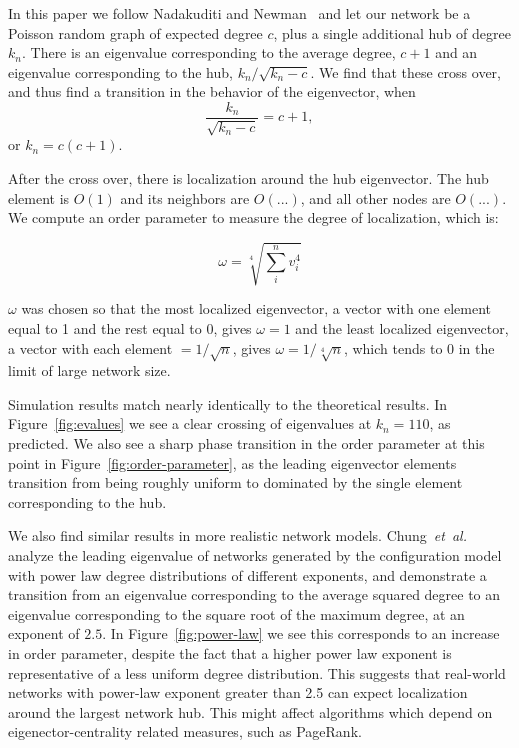 \documentclass[twocolumn,prl,superscriptaddress]{revtex4}
\newcommand{\etal}{{\it{}et~al.}}
\begin{document}
In this paper we follow Nadakuditi and Newman~\cite{nadakuditi13} and let our network be a Poisson random graph of expected degree $c$, plus a single additional hub of degree $k_n$. There is an eigenvalue corresponding to the average degree, $c+1$ and an eigenvalue corresponding to the hub, $k_n / \sqrt{k_n - c}$. We find that these cross over, and thus find a transition in the behavior of the eigenvector, when \begin{equation}\frac{k_n}{\sqrt{k_n - c}} = c+1,\end{equation} or $k_n = c(c+1)$.

After the cross over, there is localization around the hub eigenvector. The hub element is $O(1)$ and its neighbors are $O(...)$, and all other nodes are $O(...)$. We compute an order parameter to measure the degree of localization, which is:

\begin{equation}
  \omega = \sqrt[4]{\sum_i^n v_i ^ 4}
\end{equation}

$\omega$ was chosen so that the most localized eigenvector, a vector with one element equal to 1 and the rest equal to 0, gives $\omega = 1$ and the least localized eigenvector, a vector with each element $= 1/\sqrt{n}$, gives $\omega = 1/\sqrt[4]{n}$, which tends to 0 in the limit of large network size. 

Simulation results match nearly identically to the theoretical results. In Figure~\ref{fig:evalues} we see a clear crossing of eigenvalues at $k_n = 110$, as predicted. We also see a sharp phase transition in the order parameter at this point in Figure~\ref{fig:order-parameter}, as the leading eigenvector elements transition from being roughly uniform to dominated by the single element corresponding to the hub.

We also find similar results in more realistic network models. Chung~\etal~\cite{chung03} analyze the leading eigenvalue of networks generated by the configuration model with power law degree distributions of different exponents, and demonstrate a transition from an eigenvalue corresponding to the average squared degree to an eigenvalue corresponding to the square root of the maximum degree, at an exponent of $2.5$. In Figure~\ref{fig:power-law} we see this corresponds to an increase in order parameter, despite the fact that a higher power law exponent is representative of a less uniform degree distribution. This suggests that real-world networks with power-law exponent greater than 2.5 can expect localization around the largest network hub. This might affect algorithms which depend on eigenector-centrality related measures, such as PageRank.
\end{document}
